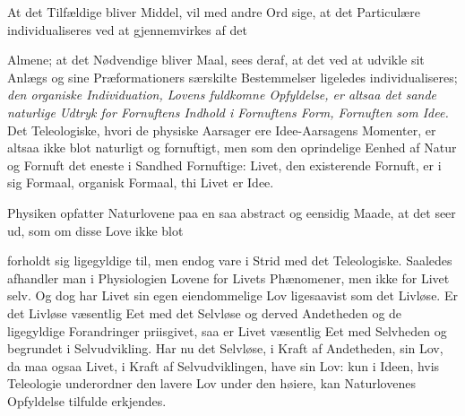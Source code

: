\documentclass[12pt,a4paper]{book}
\begin{document}

At det Tilfældige bliver Middel, vil med andre Ord sige, at det Particulære
individualiseres ved at gjennemvirkes af det

Almene; at det Nødvendige bliver Maal, sees deraf, at det ved at udvikle sit
Anlægs og sine Præformationers særskilte Bestemmelser ligeledes
individualiseres; \emph{den organiske Individuation, Lovens fuldkomne
Opfyldelse, er altsaa det sande naturlige Udtryk for Fornuftens Indhold i
Fornuftens Form, Fornuften som Idee.} Det Teleologiske, hvori de physiske
Aarsager ere Idee-Aarsagens Momenter, er altsaa ikke blot naturligt og
fornuftigt, men som den oprindelige Eenhed af Natur og Fornuft det eneste i
Sandhed Fornuftige: Livet, den existerende Fornuft, er i sig Formaal, organisk
Formaal, thi Livet er Idee.

Physiken opfatter Naturlovene paa en saa abstract og eensidig Maade, at det
seer ud, som om disse Love ikke blot

forholdt sig ligegyldige til, men endog vare i Strid med det Teleologiske.
Saaledes afhandler man i Physiologien Lovene for Livets Phænomener, men ikke
for Livet selv. Og dog har Livet sin egen eiendommelige Lov ligesaavist som det
Livløse. Er det Livløse væsentlig Eet med det Selvløse og derved Andetheden og
de ligegyldige Forandringer priisgivet, saa er Livet væsentlig Eet med
Selvheden og begrundet i Selvudvikling. Har nu det Selvløse, i Kraft af
Andetheden, sin Lov, da maa ogsaa Livet, i Kraft af Selvudviklingen, have sin
Lov: kun i Ideen, hvis Teleologie underordner den lavere Lov under den høiere,
kan Naturlovenes Opfyldelse tilfulde erkjendes.
\end{document}

